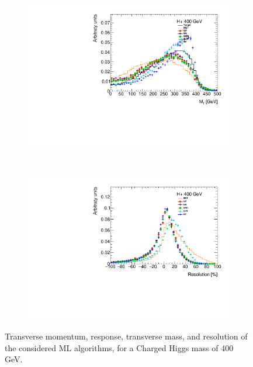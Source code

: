 \documentclass[twocolumn]{scrartcl}
\begin{document}
\begin{figure}[htpb]
    \begin{subfigure}{.48\textwidth}
        \includegraphics[width=\textwidth]{plots/mt_400.pdf}
    \end{subfigure}
    ~
    \begin{subfigure}{.48\textwidth}
        \includegraphics[width=\textwidth]{plots/resolution_400.pdf}
    \end{subfigure}
    \caption{Transverse momentum, response, transverse mass, and resolution of the considered ML algorithms, for a Charged Higgs mass of 400 GeV.}\label{fig:result400}
\end{figure}


\end{document}

